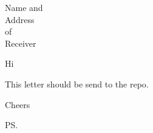 \documentclass[a4paper,12pt]{letter}
\begin{document}
\begin{letter}{Name and \\ Address \\ of \\ Receiver}

\opening{Hi} %

This letter should be send to the repo.

\closing{Cheers} %

\cc{} %
\encl{} %
\ps{} %

\end{letter}
\end{document}
